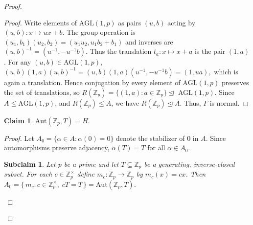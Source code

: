 \documentclass[12pt,reqno,a4paper]{amsart}
\theoremstyle{definition}
\newtheorem{claim}[defn]{Claim}
\newtheorem{subclaim}[defn]{Subclaim}
\begin{document}
\begin{proof}
\begin{proof}
Write elements of $\mathrm{AGL}(1,p)$ as pairs $(u,b)$ acting by $(u,b):x\mapsto ux+b$.
The group operation is $(u_1,b_1)(u_2,b_2)=(u_1u_2,u_1b_2+b_1)$ and inverses are
$(u,b)^{-1}=(u^{-1},-u^{-1}b)$. Thus the translation $t_a:x\mapsto x+a$ is the pair $(1,a)$.
For any $(u,b)\in\mathrm{AGL}(1,p)$,
$
(u,b)(1,a)(u,b)^{-1}=(u,b)(1,a)(u^{-1},-u^{-1}b)=(1,ua),
$
which is again a translation. Hence conjugation by every element of $\mathrm{AGL}(1,p)$
preserves the set of translations, so $R(\mathbb{Z}_{p})=\{(1,a):a\in\mathbb{Z}_p\}\unlhd $ AGL$(1,p)$.
Since $A\leq \mathrm{AGL}(1,p)$, and $R(\mathbb{Z}_{p})\leq A$, we have $R(\mathbb{Z}_{p})\unlhd A$. Thus, $\Gamma$ is normal.
 \end{proof}

\begin{claim}\label{Claim 3.4}
    $\mathrm{Aut}(\mathbb{Z}_{p},T)=H$.
\end{claim}

\begin{proof}
Let $A_0 = \{\alpha \in A : \alpha(0)=0\}$ denote the stabilizer of $0$ in $A$. 
Since automorphisms preserve adjacency, $\alpha(T)=T$ for all $\alpha\in A_0$. 

\begin{subclaim}\label{subclaim 3.5}
{\em Let $p$ be a prime and let $T \subseteq \mathbb{Z}_p$ be a generating, inverse-closed subset.  
For each $c \in \mathbb{Z}_p^{\times}$ define $m_c : \mathbb{Z}_p \to \mathbb{Z}_p$ by $m_c(x) = cx$.  
Then $A_0 = \{\, m_c : c \in \mathbb{Z}_p^{\times},\; cT = T \,\}
   = \mathrm{Aut}(\mathbb{Z}_p, T)$.
}
\end{subclaim}


\end{proof}
\end{proof}
\end{document}
